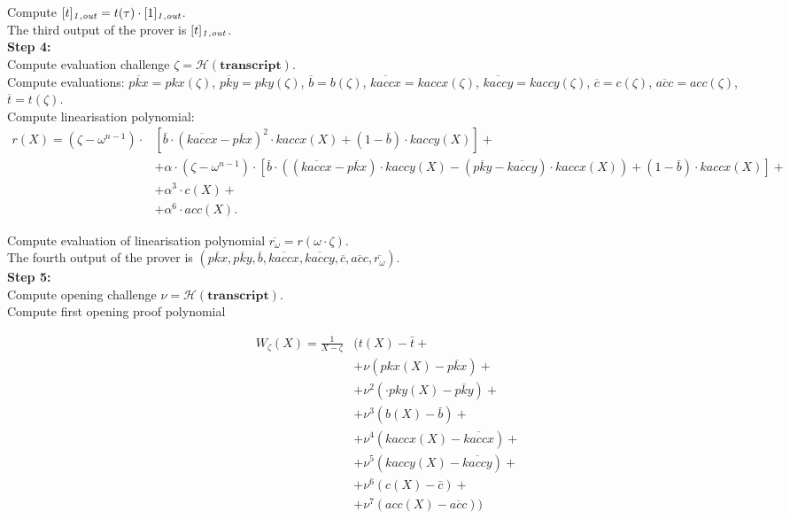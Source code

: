 \noindent Compute $[t]_{\mathit{1,out}} = t(\tau) \cdot [1]_{\mathit{1,out}}$.  \\

\noindent The third output of the prover is $[t]_{\mathit{1,out}}$. \\

\noindent \textbf{Step 4:} \\
\noindent Compute evaluation challenge $\zeta = \mathcal{H}(\mathbf{transcript})$. \\

\noindent Compute evaluations: 
$\overline{pkx} = pkx(\zeta)$, $\overline{pky}=pky(\zeta)$, $ \overline{b}=b(\zeta)$, $\overline{kaccx}=kaccx(\zeta)$, $\overline{kaccy}=kaccy(\zeta)$, 
$\overline{c}=c(\zeta)$, $\overline{acc}=acc(\zeta)$, $\overline{t}=t(\zeta)$. \\

\noindent Compute linearisation polynomial: 
\begin{align*}
r(X) = (\zeta - \omega^{n-1}) \cdot &[\bar{b} \cdot (\overline{kaccx} - \overline{pkx})^2 \cdot kaccx( X) + (1 - \bar{b})\cdot kaccy(X)]+ \\
&+ \alpha \cdot (\zeta - \omega^{n-1}) \cdot [\bar{b} \cdot ((\overline{kaccx} - \overline{pkx}) \cdot kaccy(X) - (\overline{pky} - \overline{kaccy}) \cdot kaccx(X)) + (1 - \bar{b}) \cdot kaccx(X)]+ \\
&+\alpha^3 \cdot c(X)+ \\
&+\alpha^6 \cdot acc(X).
\end{align*}

\noindent Compute evaluation of linearisation polynomial $\overline{r_{\omega}} = r(\omega \cdot \zeta)$. \\

\noindent The fourth output of the prover is $(\overline{pkx}, \overline{pky}, \overline{b}, \overline{kaccx}, \overline{kaccy}, \overline{c}, \overline{acc},\overline{r_{\omega}})$. \\

\noindent \textbf{Step 5:} \\
\noindent Compute opening challenge $\nu = \mathcal{H}(\mathbf{transcript})$.  \\

\noindent Compute first opening proof polynomial

\begin{align*} 
W_{\zeta}(X) = \frac{1}{X-\zeta}&(t(X) - \bar{t}+ \\ 
&+ \nu(pkx(X) - \overline{pkx}) +\\
&+  \nu^2(\cdot pky(X) - \overline{pky}) + \\ 
&+ \nu^3 (b(X) - \bar{b}) + \\
&+ \nu^4( kaccx(X) - \overline{kaccx}) + \\  
&+ \nu^5(kaccy(X) - \overline{kaccy}) +  \\ 
&+ \nu^6 (c(X) -\bar{c}) + \\ 
&+ \nu^7 (acc(X) - \overline{acc}))
\end{align*}

